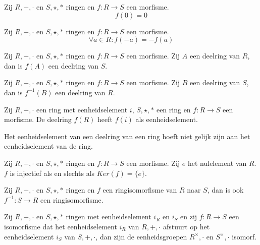 \documentclass[main.tex]{subfiles}
\begin{document}
\begin{ei}
  Zij $R,+,\cdot$ en $S,\star,*$ ringen en $f:R \rightarrow S$ een morfisme.
  \[ f(0) = 0 \]
\end{ei}
 
\begin{ei}
  Zij $R,+,\cdot$ en $S,\star,*$ ringen en $f:R \rightarrow S$ een morfisme.
  \[ \forall a \in R: f(-a) = -f(a) \]
\end{ei}

\begin{ei}
  Zij $R,+,\cdot$ en $S,\star,*$ ringen en $f:R \rightarrow S$ een morfisme.
  Zij $A$ een deelring van $R$, dan is $f(A)$ een deelring van $S$.
\end{ei}

\begin{ei}
  Zij $R,+,\cdot$ en $S,\star,*$ ringen en $f:R \rightarrow S$ een morfisme.
  Zij $B$ een deelring van $S$, dan is $f^{-1}(B)$ een deelring van $R$.
\end{ei}

\begin{ei}
  Zij $R,+,\cdot$ een ring met eenheidselement $i$, $S,\star,*$ een ring en $f:R \rightarrow S$ een morfisme.
  De deelring $f(R)$ heeft $f(i)$ als eenheidselement.
\end{ei}

\begin{opm}
  Het eenheidselement van een deelring van een ring hoeft niet gelijk zijn aan het eenheidselement van de ring.
\end{opm}

\begin{ei}
  Zij $R,+,\cdot$ en $S,\star,*$ ringen en $f:R \rightarrow S$ een morfisme.
  Zij $e$ het nulelement van $R$.
  $f$ is injectief als en slechts als $Ker(f) = \{e\}$.
\end{ei}

\begin{ei}
  Zij $R,+,\cdot$ en $S,\star,*$ ringen en $f$ een ringisomorfisme van $R$ naar $S$, dan is ook $f^{-1}: S \rightarrow R$ een ringisomorfisme.
\end{ei}

\begin{st}
  Zij $R,+,\cdot$ en $S,\star,*$ ringen met eenheidselement $i_{R}$ en $i_{S}$ en zij $f: R\rightarrow S$ een isomorfisme dat het eenheidselement $i_{R}$ van $R,+,\cdot$ afstuurt op het eenheidselement $i_{S}$ van $S,+,\cdot$, dan zijn de eenheidsgroepen $R^{\times},\cdot$ en $S^{\times},\cdot$ isomorf.
\end{st}
\end{document}
